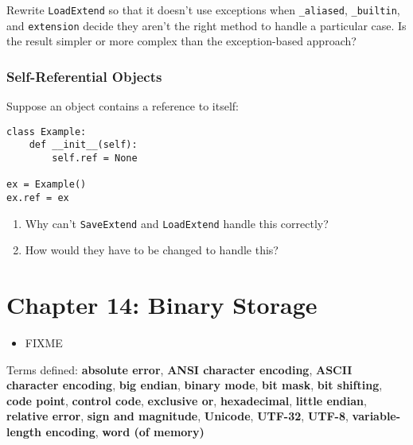 \documentclass{scrbook}
\newcommand{\glossref}[1]{\textbf{#1}}
\begin{document}
Rewrite \texttt{LoadExtend} so that it doesn't use exceptions
when \texttt{\_aliased}, \texttt{\_builtin}, and \texttt{extension} decide
they aren't the right method to handle a particular case.
Is the result simpler or more complex than the exception-based approach?

\subsection*{Self-Referential Objects}


Suppose an object contains a reference to itself:

\begin{lstlisting}[frame=single,frameround=tttt]
class Example:
    def __init__(self):
        self.ref = None

ex = Example()
ex.ref = ex
\end{lstlisting}

\begin{enumerate}

\item 

Why can't \texttt{SaveExtend} and \texttt{LoadExtend} handle this correctly?



\item 

How would they have to be changed to handle this?



\end{enumerate}

\chapter{Chapter 14: Binary Storage}\label{binary}

\begin{itemize}

\item FIXME

\end{itemize}


\noindent 
    Terms defined:
    \glossref{absolute error}, \glossref{ANSI character encoding}, \glossref{ASCII character encoding}, \glossref{big endian}, \glossref{binary mode}, \glossref{bit mask}, \glossref{bit shifting}, \glossref{code point}, \glossref{control code}, \glossref{exclusive or}, \glossref{hexadecimal}, \glossref{little endian}, \glossref{relative error}, \glossref{sign and magnitude}, \glossref{Unicode}, \glossref{UTF-32}, \glossref{UTF-8}, \glossref{variable-length encoding}, \glossref{word (of memory)}
\end{document}
